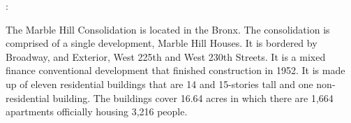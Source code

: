 :  

   

The Marble Hill Consolidation is located in the Bronx. The consolidation is comprised of a single development, Marble Hill Houses. It is bordered by Broadway, and Exterior, West 225th and West 230th Streets. It is a mixed finance conventional development that finished construction in 1952. It is made up of eleven residential buildings that are 14 and 15-stories tall and one non-residential building. The buildings cover 16.64 acres in which there are 1,664 apartments officially housing 3,216 people.    